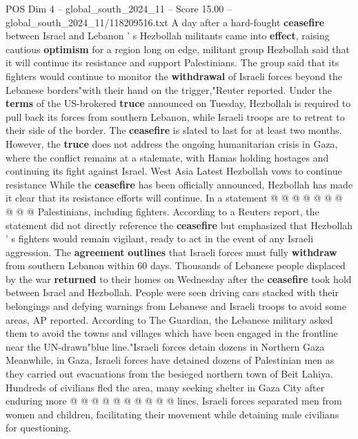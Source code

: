 \begin{textsample}{POS Dim 4 – global\_south\_2024\_11 – Score 15.00 – global\_south\_2024\_11/118209516.txt}  \label{ex:f4_pos_260}
A day after a hard-fought \textbf{ceasefire} between Israel and Lebanon ' s Hezbollah militants came into \textbf{effect}, raising cautious \textbf{optimism} for a region long on edge, militant group Hezbollah said that it will continue its resistance and support Palestinians.
The group said that its fighters would continue to monitor the \textbf{withdrawal} of Israeli forces beyond the Lebanese borders"with their hand on the trigger,"Reuter reported.
Under the \textbf{terms} of the US-brokered \textbf{truce} announced on Tuesday, Hezbollah is required to pull back its forces from southern Lebanon, while Israeli troops are to retreat to their side of the border.
The \textbf{ceasefire} is slated to last for at least two months.
However, the \textbf{truce} does not address the ongoing humanitarian crisis in Gaza, where the conflict remains at a stalemate, with Hamas holding hostages and continuing its fight against Israel.
West Asia Latest Hezbollah vows to continue resistance While the \textbf{ceasefire} has been officially announced, Hezbollah has made it clear that its resistance efforts will continue.
In a statement @ @ @ @ @ @ @ @ @ @ Palestinians, including fighters.
According to a Reuters report, the statement did not directly reference the \textbf{ceasefire} but emphasized that Hezbollah ' s fighters would remain vigilant, ready to act in the event of any Israeli aggression.
The \textbf{agreement} \textbf{outlines} that Israeli forces must fully \textbf{withdraw} from southern Lebanon within 60 days.
Thousands of Lebanese people displaced by the war \textbf{returned} to their homes on Wednesday after the \textbf{ceasefire} took hold between Israel and Hezbollah.
People were seen driving cars stacked with their belongings and defying warnings from Lebanese and Israeli troops to avoid some areas, AP reported.
According to The Guardian, the Lebanese military asked them to avoid the towns and villages which have been engaged in the frontline near the UN-drawn"blue line."Israeli forces detain dozens in Northern Gaza Meanwhile, in Gaza, Israeli forces have detained dozens of Palestinian men as they carried out evacuations from the besieged northern town of Beit Lahiya.
Hundreds of civilians fled the area, many seeking shelter in Gaza City after enduring more @ @ @ @ @ @ @ @ @ @ lines, Israeli forces separated men from women and children, facilitating their movement while detaining male civilians for questioning.

\end{textsample}
